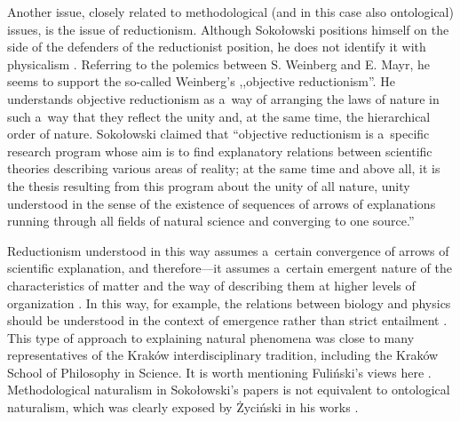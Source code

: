 \documentclass[%
  manuscript=article,
  year=2024,
  volume=77,
  doi=10.59203/zfn.77.689,
]{zfn}
\begin{document}
Another issue, closely related to methodological (and in this case also ontological) issues, is the issue of reductionism. Although Sokołowski positions himself on the side of the defenders of the reductionist position, he does not identify it with physicalism 
\parencite[][]{Sokoowski1999Maa}. %
 Referring to the polemics between S. Weinberg and E. Mayr, he seems to support the so-called Weinberg's ,,objective reductionism''. He understands objective reductionism as a~way of arranging the laws of nature in such a~way that they reflect the unity and, at the same time, the hierarchical order of nature. Sokołowski claimed that ``objective reductionism is a~specific research program whose aim is to find explanatory relations between scientific theories describing various areas of reality; at the same time and above all, it is the thesis resulting from this program about the unity of all nature, unity understood in the sense of the existence of sequences of arrows of explanations running through all fields of natural science and converging to one source.''
\parencite[][p.75]{Sokoowski1999Maa}%




Reductionism understood in this way assumes a~certain convergence of arrows of scientific explanation, and therefore---it assumes a~certain emergent nature of the characteristics of matter and the way of describing them at higher levels of organization 
\parencite[see][]{Sokoowski2006Teorie}. %
 In this way, for example, the relations between biology and physics should be understood in the context of emergence rather than strict entailment 
\parencite[][p.216]{Sokoowski2001Wspoczesne}. %
 This type of approach to explaining natural phenomena was close to many representatives of the Kraków interdisciplinary tradition, including the Kraków School of Philosophy in Science. It is worth mentioning Fuliński's views here 
\parencite[e.g.,][]{Fulinski1993O}. %
 Methodological naturalism in Sokołowski's papers is not equivalent to ontological naturalism, which was clearly exposed by Życiński in his works 
\parencite[][]{Zycinski2003Naturalizm}.%
\end{document}
